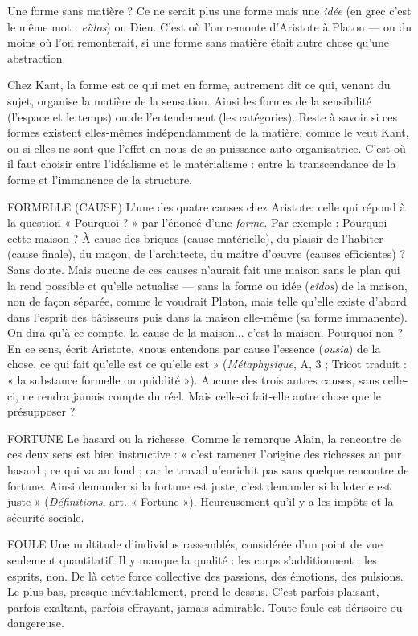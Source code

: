 Une forme sans matière ? Ce ne serait plus une forme mais une {\it idée} (en grec
c’est le même mot : {\it eîdos}) ou Dieu. C’est où l’on remonte d’Aristote à Platon —
ou du moins où l’on remonterait, si une forme sans matière était autre chose
qu’une abstraction.

Chez Kant, la forme est ce qui met en forme, autrement dit ce qui, venant
du sujet, organise la matière de la sensation. Ainsi les formes de la sensibilité
(l'espace et le temps) ou de l’entendement (les catégories). Reste à savoir si ces
formes existent elles-mêmes indépendamment de la matière, comme le veut
Kant, ou si elles ne sont que l’effet en nous de sa puissance auto-organisatrice.
C’est où il faut choisir entre l’idéalisme et le matérialisme : entre la transcendance
de la forme et l’immanence de la structure.

FORMELLE (CAUSE)  L’une des quatre causes chez Aristote: celle qui
répond à la question « Pourquoi ? » par l’énoncé
d’une {\it forme}. Par exemple : Pourquoi cette maison ? À cause des briques (cause
matérielle), du plaisir de l’habiter (cause finale), du maçon, de l’architecte, du
maître d'œuvre (causes efficientes) ? Sans doute. Mais aucune de ces causes
n'aurait fait une maison sans le plan qui la rend possible et qu’elle actualise —
sans la forme ou idée ({\it eîdos}) de la maison, non de façon séparée, comme le voudrait
Platon, mais telle qu’elle existe d’abord dans l'esprit des bâtisseurs puis
dans la maison elle-même (sa forme immanente). On dira qu’à ce compte, la
cause de la maison... c’est la maison. Pourquoi non ? En ce sens, écrit Aristote,
«nous entendons par cause l’essence ({\it ousia}) de la chose, ce qui fait qu’elle est
ce qu'elle est » ({\it Métaphysique}, A, 3 ; Tricot traduit : « la substance formelle ou
quiddité »). Aucune des trois autres causes, sans celle-ci, ne rendra jamais
compte du réel. Mais celle-ci fait-elle autre chose que le présupposer ?

FORTUNE Le hasard ou la richesse. Comme le remarque Alain, la rencontre
de ces deux sens est bien instructive : « c’est ramener
l’origine des richesses au pur hasard ; ce qui va au fond ; car le travail n’enrichit
pas sans quelque rencontre de fortune. Ainsi demander si la fortune est juste,
c'est demander si la loterie est juste » ({\it Définitions}, art. « Fortune »). Heureusement
qu'il y a les impôts et la sécurité sociale.

FOULE Une multitude d’individus rassemblés, considérée d’un point de
vue seulement quantitatif. Il y manque la qualité : les corps
s’additionnent ; les esprits, non. De là cette force collective des passions, des
émotions, des pulsions. Le plus bas, presque inévitablement, prend le dessus.
C’est parfois plaisant, parfois exaltant, parfois effrayant, jamais admirable.
Toute foule est dérisoire ou dangereuse.

